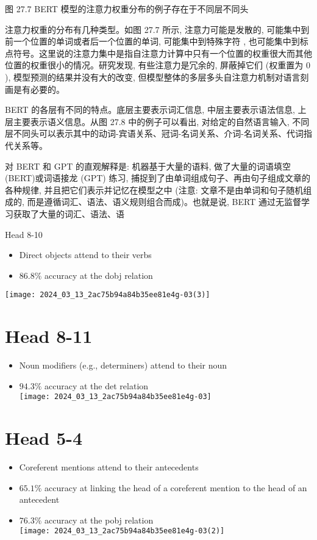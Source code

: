 \documentclass[10pt]{article}
\begin{document}
图 27.7 BERT 模型的注意力权重分布的例子存在于不同层不同头

注意力权重的分布有几种类型。如图 27.7 所示, 注意力可能是发散的, 可能集中到前一个位置的单词或者后一个位置的单词, 可能集中到特殊字符 , 也可能集中到标点符号。这里说的注意力集中是指自注意力计算中只有一个位置的权重很大而其他位置的权重很小的情况。研究发现, 有些注意力是冗余的, 屏蔽掉它们 (权重置为 0 ), 模型预测的结果并没有大的改变, 但模型整体的多层多头自注意力机制对语言刻画是有必要的。

BERT 的各层有不同的特点。底层主要表示词汇信息, 中层主要表示语法信息, 上层主要表示语义信息。从图 27.8 中的例子可以看出, 对给定的自然语言输入, 不同层不同头可以表示其中的动词-宾语关系、冠词-名词关系、介词-名词关系、代词指代关系等。

对 BERT 和 GPT 的直观解释是: 机器基于大量的语料, 做了大量的词语填空 (BERT)或词语接龙 (GPT) 练习, 捕捉到了由单词组成句子、再由句子组成文章的各种规律, 并且把它们表示并记忆在模型之中 (注意: 文章不是由单词和句子随机组成的, 而是遵循词汇、语法、语义规则组合而成)。也就是说, BERT 通过无监督学习获取了大量的词汇、语法、语

Head 8-10

\begin{itemize}
  \item Direct objects attend to their verbs
  \item $86.8 \%$ accuracy at the dobj relation
\end{itemize}

\begin{center}
\texttt{[image: 2024\_03\_13\_2ac75b94a84b35ee81e4g-03(3)]}
\end{center}

\section*{Head 8-11}
\begin{itemize}
  \item Noun modifiers (e.g., determiners) attend to their noun
  \item $94.3 \%$ accuracy at the det relation\\
\texttt{[image: 2024\_03\_13\_2ac75b94a84b35ee81e4g-03]}
\end{itemize}

\section*{Head 5-4}
\begin{itemize}
  \item Coreferent mentions attend to their antecedents
  \item $65.1 \%$ accuracy at linking the head of a coreferent mention to the head of an antecedent
  \item $76.3 \%$ accuracy at the pobj relation\\
\texttt{[image: 2024\_03\_13\_2ac75b94a84b35ee81e4g-03(2)]}
\end{itemize}
\end{document}
